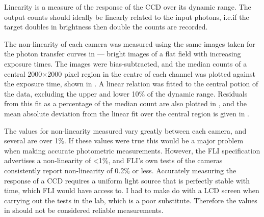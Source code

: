 \begin{colsection}
\begin{colsection}
Linearity is a measure of the response of the CCD over its dynamic range. The output counts should ideally be linearly related to the input photons, i.e.\@ if the target doubles in brightness then double the counts are recorded.

The non-linearity of each camera was measured using the same images taken for the photon transfer curves in  --- bright images of a flat field with increasing exposure times. The images were bias-subtracted, and the median counts of a central 2000$\times$2000 pixel region in the centre of each channel was plotted against the exposure time, shown in . A linear relation was fitted to the central potion of the data, excluding the upper and lower 10\% of the dynamic range. Residuals from this fit as a percentage of the median count are also plotted in , and the mean absolute deviation from the linear fit over the central region is given in .

The values for non-linearity measured vary greatly between each camera, and several are over 1\%. If these values were true this would be a major problem when making accurate photometric measurements. However, the FLI specification advertises a non-linearity of <1\%, and FLI's own tests of the cameras consistently report non-linearity of 0.2\% or less. Accurately measuring the response of a CCD requires a uniform light source that is perfectly stable with time, which FLI would have access to. I had to make do with a LCD screen when carrying out the tests in the lab, which is a poor substitute. Therefore the values in  should not be considered reliable measurements.


\end{colsection}
\end{colsection}
